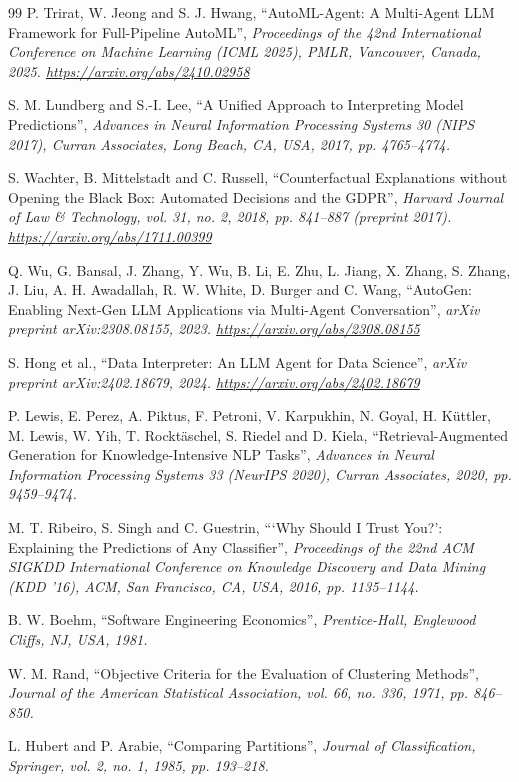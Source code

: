 \begin{thebibliography}{99}
 P. Trirat, W. Jeong and S. J. Hwang, ``AutoML-Agent: A Multi-Agent LLM Framework for Full-Pipeline AutoML'', \textit{Proceedings of the 42nd International Conference on Machine Learning (ICML 2025), PMLR, Vancouver, Canada, 2025. \url{https://arxiv.org/abs/2410.02958}}

 S. M. Lundberg and S.-I. Lee, ``A Unified Approach to Interpreting Model Predictions'', \textit{Advances in Neural Information Processing Systems 30 (NIPS 2017), Curran Associates, Long Beach, CA, USA, 2017, pp. 4765--4774.}

 S. Wachter, B. Mittelstadt and C. Russell, ``Counterfactual Explanations without Opening the Black Box: Automated Decisions and the GDPR'', \textit{Harvard Journal of Law \& Technology, vol. 31, no. 2, 2018, pp. 841--887 (preprint 2017). \url{https://arxiv.org/abs/1711.00399}}

 Q. Wu, G. Bansal, J. Zhang, Y. Wu, B. Li, E. Zhu, L. Jiang, X. Zhang, S. Zhang, J. Liu, A. H. Awadallah, R. W. White, D. Burger and C. Wang, ``AutoGen: Enabling Next-Gen LLM Applications via Multi-Agent Conversation'', \textit{arXiv preprint arXiv:2308.08155, 2023. \url{https://arxiv.org/abs/2308.08155}}

 S. Hong et al., ``Data Interpreter: An LLM Agent for Data Science'', \textit{arXiv preprint arXiv:2402.18679, 2024. \url{https://arxiv.org/abs/2402.18679}}

 P. Lewis, E. Perez, A. Piktus, F. Petroni, V. Karpukhin, N. Goyal, H. K\"{u}ttler, M. Lewis, W. Yih, T. Rockt\"{a}schel, S. Riedel and D. Kiela, ``Retrieval-Augmented Generation for Knowledge-Intensive NLP Tasks'', \textit{Advances in Neural Information Processing Systems 33 (NeurIPS 2020), Curran Associates, 2020, pp. 9459--9474.}

 M. T. Ribeiro, S. Singh and C. Guestrin, ``{}`Why Should I Trust You?': Explaining the Predictions of Any Classifier'', \textit{Proceedings of the 22nd ACM SIGKDD International Conference on Knowledge Discovery and Data Mining (KDD '16), ACM, San Francisco, CA, USA, 2016, pp. 1135--1144.}

 B. W. Boehm, ``Software Engineering Economics'', \textit{Prentice-Hall, Englewood Cliffs, NJ, USA, 1981.}

 W. M. Rand, ``Objective Criteria for the Evaluation of Clustering Methods'', \textit{Journal of the American Statistical Association, vol. 66, no. 336, 1971, pp. 846--850.}

 L. Hubert and P. Arabie, ``Comparing Partitions'', \textit{Journal of Classification, Springer, vol. 2, no. 1, 1985, pp. 193--218.}

\end{thebibliography}
